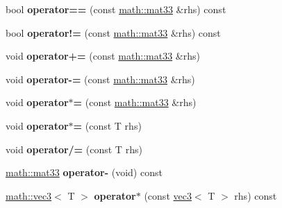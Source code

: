\begin{DoxyCompactItemize}
\item 
\hypertarget{classmath_1_1mat33_afe5577b76afad2f4be3c52a5708735fd}{
bool {\bfseries operator==} (const \hyperlink{classmath_1_1mat33}{math::mat33} \&rhs) const }
\label{classmath_1_1mat33_afe5577b76afad2f4be3c52a5708735fd}

\item 
\hypertarget{classmath_1_1mat33_a190273063afd779438fdb702eb4b0a01}{
bool {\bfseries operator!=} (const \hyperlink{classmath_1_1mat33}{math::mat33} \&rhs) const }
\label{classmath_1_1mat33_a190273063afd779438fdb702eb4b0a01}

\item 
\hypertarget{classmath_1_1mat33_af885ad7231268e6d9047935749a058b2}{
void {\bfseries operator+=} (const \hyperlink{classmath_1_1mat33}{math::mat33} \&rhs)}
\label{classmath_1_1mat33_af885ad7231268e6d9047935749a058b2}

\item 
\hypertarget{classmath_1_1mat33_a62585fd156948bcb3ad1bb83f663bad3}{
void {\bfseries operator-\/=} (const \hyperlink{classmath_1_1mat33}{math::mat33} \&rhs)}
\label{classmath_1_1mat33_a62585fd156948bcb3ad1bb83f663bad3}

\item 
\hypertarget{classmath_1_1mat33_a65cabca229ddaf84b9c9f20a52e83983}{
void {\bfseries operator$\ast$=} (const \hyperlink{classmath_1_1mat33}{math::mat33} \&rhs)}
\label{classmath_1_1mat33_a65cabca229ddaf84b9c9f20a52e83983}

\item 
\hypertarget{classmath_1_1mat33_a16d436cab3d8f47d53eb193294167545}{
void {\bfseries operator$\ast$=} (const T rhs)}
\label{classmath_1_1mat33_a16d436cab3d8f47d53eb193294167545}

\item 
\hypertarget{classmath_1_1mat33_aaf60baf7884b4c0f2c4f18ea71365a17}{
void {\bfseries operator/=} (const T rhs)}
\label{classmath_1_1mat33_aaf60baf7884b4c0f2c4f18ea71365a17}

\item 
\hypertarget{classmath_1_1mat33_a326632eb3ae37c3a80fad7d29888a244}{
\hyperlink{classmath_1_1mat33}{math::mat33} {\bfseries operator-\/} (void) const }
\label{classmath_1_1mat33_a326632eb3ae37c3a80fad7d29888a244}

\item 
\hypertarget{classmath_1_1mat33_a31a1e0240ed69565f6806484bc299de5}{
\hyperlink{classmath_1_1vec3}{math::vec3}$<$ T $>$ {\bfseries operator$\ast$} (const \hyperlink{classmath_1_1vec3}{vec3}$<$ T $>$ rhs) const }
\label{classmath_1_1mat33_a31a1e0240ed69565f6806484bc299de5}


\end{DoxyCompactItemize}
